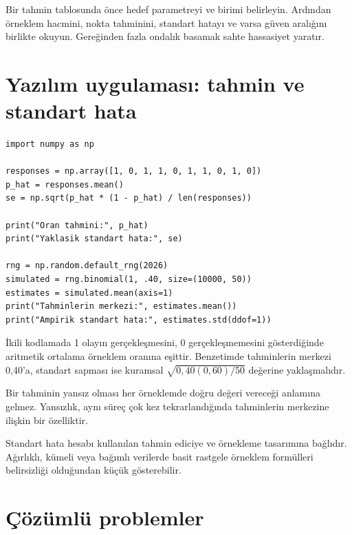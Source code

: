 \begin{outputguidebox}
Bir tahmin tablosunda önce hedef parametreyi ve birimi belirleyin. Ardından
örneklem hacmini, nokta tahminini, standart hatayı ve varsa güven aralığını
birlikte okuyun. Gereğinden fazla ondalık basamak sahte hassasiyet yaratır.
\end{outputguidebox}

\section{Yazılım uygulaması: tahmin ve standart hata}

\begin{softwarebox}
\begin{lstlisting}
import numpy as np

responses = np.array([1, 0, 1, 1, 0, 1, 1, 0, 1, 0])
p_hat = responses.mean()
se = np.sqrt(p_hat * (1 - p_hat) / len(responses))

print("Oran tahmini:", p_hat)
print("Yaklasik standart hata:", se)

rng = np.random.default_rng(2026)
simulated = rng.binomial(1, .40, size=(10000, 50))
estimates = simulated.mean(axis=1)
print("Tahminlerin merkezi:", estimates.mean())
print("Ampirik standart hata:", estimates.std(ddof=1))
\end{lstlisting}
İkili kodlamada 1 olayın gerçekleşmesini, 0 gerçekleşmemesini gösterdiğinde
aritmetik ortalama örneklem oranına eşittir. Benzetimde tahminlerin merkezi
0,40'a, standart sapması ise kuramsal $\sqrt{0{,}40(0{,}60)/50}$ değerine
yaklaşmalıdır.
\end{softwarebox}

\begin{mistakebox}
Bir tahminin yansız olması her örneklemde doğru değeri vereceği anlamına
gelmez. Yansızlık, aynı süreç çok kez tekrarlandığında tahminlerin merkezine
ilişkin bir özelliktir.
\end{mistakebox}

\begin{assumptionbox}
Standart hata hesabı kullanılan tahmin ediciye ve örnekleme tasarımına
bağlıdır. Ağırlıklı, kümeli veya bağımlı verilerde basit rastgele örneklem
formülleri belirsizliği olduğundan küçük gösterebilir.
\end{assumptionbox}

\section{Çözümlü problemler}

